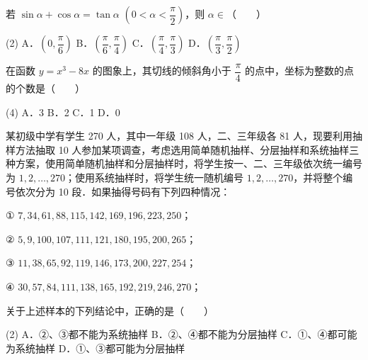 \begin{question}
若 $\sin\alpha + \cos\alpha = \tan\alpha$ $\left(0 < \alpha < \dfrac{\pi}{2}\right)$，则 $\alpha \in$\mbox{（　　）}

\begin{gkopts}(2)
\task A．$\left(0, \dfrac{\pi}{6}\right)$
\task B．$\left(\dfrac{\pi}{6}, \dfrac{\pi}{4}\right)$
\task C．$\left(\dfrac{\pi}{4}, \dfrac{\pi}{3}\right)$
\task D．$\left(\dfrac{\pi}{3}, \dfrac{\pi}{2}\right)$
\end{gkopts}

\end{question}
\begin{question}
在函数 $y = x^3 - 8x$ 的图象上，其切线的倾斜角小于 $\dfrac{\pi}{4}$ 的点中，坐标为整数的点的个数是\mbox{（　　）}

\begin{gkopts}(4)
\task A．3
\task B．2
\task C．1
\task D．0
\end{gkopts}

\end{question}
\begin{question}
某初级中学有学生 270 人，其中一年级 108 人，二、三年级各 81 人，现要利用抽样方法抽取 10 人参加某项调查，考虑选用简单随机抽样、分层抽样和系统抽样三种方案，使用简单随机抽样和分层抽样时，将学生按一、二、三年级依次统一编号为 $1, 2, \dots, 270$；使用系统抽样时，将学生统一随机编号 $1, 2, \dots, 270$，并将整个编号依次分为 10 段．如果抽得号码有下列四种情况：

① $7, 34, 61, 88, 115, 142, 169, 196, 223, 250$；

② $5, 9, 100, 107, 111, 121, 180, 195, 200, 265$；

③ $11, 38, 65, 92, 119, 146, 173, 200, 227, 254$；

④ $30, 57, 84, 111, 138, 165, 192, 219, 246, 270$；

关于上述样本的下列结论中，正确的是\mbox{（　　）}

\begin{gkopts}(2)
\task A．②、③都不能为系统抽样
\task B．②、④都不能为分层抽样
\task C．①、④都可能为系统抽样
\task D．①、③都可能为分层抽样
\end{gkopts}

\end{question}

